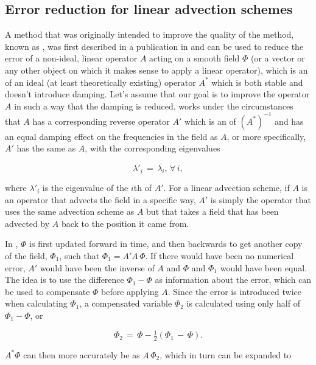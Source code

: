 \subsection{Error reduction for linear advection schemes}

A method that was originally intended to improve the quality of the \LS method, known as \BFECC, was first described in a publication in \citeyear{Dupont2003} \citep{Dupont2003} and can be used to reduce the error of a non-ideal, linear operator $A$ acting on a smooth field $\Phi$ (or a vector or any other object on which it makes sense to apply a linear operator), which is an \approximation of an ideal (at least theoretically existing) operator $A^*$ which is both stable and doesn't introduce damping. Let's assume that our goal is to improve the operator $A$ in such a way that the damping is reduced. \BFECC works under the circumstances that $A$ has a corresponding reverse operator $A'$ which is an \approximation of $(A^*)^{-1}$ and has an equal damping effect on the frequencies in the field as $A$, or more specifically, $A'$ has the same \eigenfunctions as $A$, with the corresponding eigenvalues

\begin{equation}
\lambda'_i \,=\, \overline{\lambda_i}, \,\forall\,i,
\end{equation}

where $\lambda'_i$ is the eigenvalue of the $i$th \eigenfunction of $A'$. For a linear advection scheme, if $A$ is an operator that advects the field in a specific way, $A'$ is simply the operator that uses the same advection scheme as $A$ but that takes a field that has been advected by $A$ back to the position it came from.

In \BFECC, $\Phi$ is first updated forward in time, and then backwards to get another copy of the field, $\Phi_1$, such that $\Phi_1 = A'A\,\Phi$. If there would have been no numerical error, $A'$ would have been the inverse of $A$ and $\Phi$ and $\Phi_1$ would have been equal. The idea is to use the difference $\Phi_1-\Phi$ as information about the error, which can be used to compensate $\Phi$ before applying $A$. Since the error is introduced twice when calculating $\Phi_1$, a compensated variable $\Phi_2$ is calculated using only half of $\Phi_1-\Phi$, or

\begin{equation}
\Phi_2 \,=\, \Phi - \tfrac{1}{2}(\Phi_1 \,-\, \Phi).
\end{equation}

$A^*\Phi$ can then more accurately be \approximated as $A\,\Phi_2$, which in turn can be expanded to

